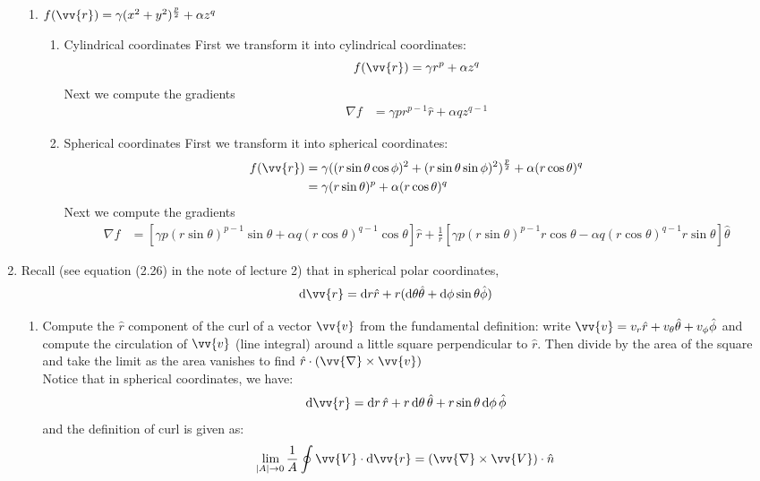 \documentclass{article}
\newcommand{\de}{\mathrm{d}}
\begin{document}
\begin{enumerate}
\begin{enumerate}
        \item $f(\vv{r}) = \gamma (x^2+y^2)^{\frac{p}{2}}+\alpha z^q$
        \begin{enumerate}
            \item Cylindrical coordinates
            First we transform it into cylindrical coordinates:
            \[
            f(\vv{r}) = \gamma r^{p}+\alpha z^q
            \]
            Next we compute the gradients
            \begin{align*}
            \nabla f &= \gamma pr^{p-1} \hat{r} + \alpha q z^{q-1}
            \end{align*}
            \item Spherical coordinates 
            First we transform it into spherical coordinates:
            \begin{align*}
                f(\vv{r}) &= \gamma ((r\sin\theta\cos\phi)^2+(r\sin\theta\sin\phi)^2)^{\frac{p}{2}}+\alpha (r\cos\theta)^q \\
                          &= \gamma (r\sin\theta)^p+\alpha (r\cos\theta)^q
            \end{align*}
            Next we compute the gradients
            \begin{align*}
            \nabla f &= [\gamma p (r\sin\theta)^{p-1}\sin\theta +\alpha q (r\cos\theta)^{q-1}\cos\theta]\hat{r} + \frac{1}{r}[\gamma p (r\sin\theta)^{p-1} r \cos\theta - \alpha q (r\cos\theta)^{q-1}r\sin\theta]\hat{\theta}
            \end{align*}
        \end{enumerate}
    \end{enumerate}
    \item Recall (see equation (2.26) in the note of lecture 2) that in spherical polar coordinates,
    \[
    \de \vv{r} = \de r \hat{r} + r(\de \theta \hat{\theta} + \de \phi \sin\theta\hat{\phi})
    \]
    \begin{enumerate}
        \item Compute the $\hat{r}$ component of the curl of a vector $\vv{v}$ from the fundamental definition: write $\vv{v} = v_r\hat{r}+v_\theta\hat{\theta}+v_\phi\hat{\phi}$ and compute the circulation of $\vv{v}$ (line integral) around a little square perpendicular to $\hat{r}$. Then divide by the area of the square and take the limit as the area vanishes to find $\hat{r}\cdot(\vv{\nabla} \times \vv{v})$\\

        Notice that in spherical coordinates, we have:
        \[
        \mathrm{d}\vv{r} = \mathrm{d}r\,\hat{r} + r\,\mathrm{d}\theta \,\hat{\theta } + r \sin{\theta} \, \mathrm{d}\phi\,\hat{\phi}
        \]
        and the definition of curl is given as:
        \[
        \lim_{\abs{A} \rightarrow 0} \frac{1}{A} \oint \vv{V} \cdot \de \vv{r} = (\vv{\nabla} \times \vv{V})\cdot \hat{n}
        \]


\end{enumerate}
\end{enumerate}
\end{document}
